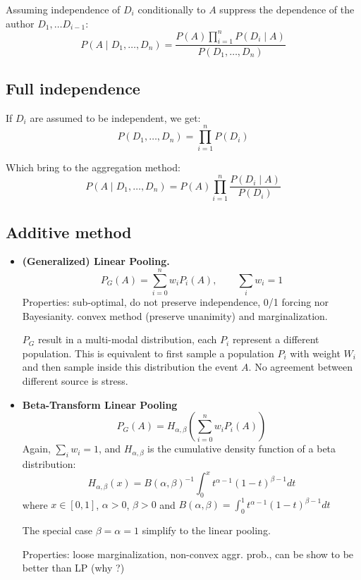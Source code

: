 \documentclass[twocolumn]{article}
\numberwithin{equation}{section}
\begin{document}
Assuming independence of $D_i$ conditionally to $A$  suppress the dependence of the author $D_1, \ldots D_{i-1}$:
$$P(A \mid D_1,\ldots,D_n) = \frac{P(A) \prod_{i=1}^n  P(D_i \mid A) }{P(D_1,\ldots,D_n)}$$

	\subsection{Full independence}
If $D_i$ are assumed to be independent, we get:
$$P(D_1,\ldots,D_n) = \prod_{i=1}^n P(D_i)$$

Which bring to the aggregation method:
$$P(A \mid D_1,\ldots,D_n)=P(A) \prod_{i=1}^n \frac{P(D_i \mid A)}{P(D_i)}$$

	\subsection{Additive method}
\begin{itemize}
	\item \textbf{(Generalized) Linear Pooling.} 
$$P_G(A) = \sum_{i=0}^nw_i P_i(A), \qquad \sum_i w_i=1$$
Properties: sub-optimal, do not preserve independence, 0/1 forcing nor Bayesianity. convex method (preserve unanimity) and marginalization.

$P_G$ result in a multi-modal distribution, each $P_i$ represent a different population. This is equivalent to first sample a population $P_i$ with weight $W_i$ and then sample inside this distribution the event $A$. No agreement between different source is stress.

	\item \textbf{Beta-Transform Linear Pooling}
$$P_G(A) = H_{\alpha,\beta}\left( \sum_{i=0}^n w_i P_i(A) \right)$$
Again, $\sum_i w_i=1$, and $H_{\alpha,\beta}$ is the cumulative density function of a beta distribution:
$$H_{\alpha,\beta}(x)= B(\alpha,\beta)^{-1} \int_0^x t^{\alpha-1}(1-t)^{\beta-1} dt $$
where $x\in [0,1]$, $\alpha> 0$, $\beta> 0$  and $B(\alpha,\beta)=\int_0^1 t^{\alpha-1}(1-t)^{\beta-1} dt$

The special case $\beta=\alpha=1$ simplify to the linear pooling. 

Properties: loose marginalization, non-convex aggr. prob., can be show to be better than LP (why ?)
\end{itemize}
\end{document}
